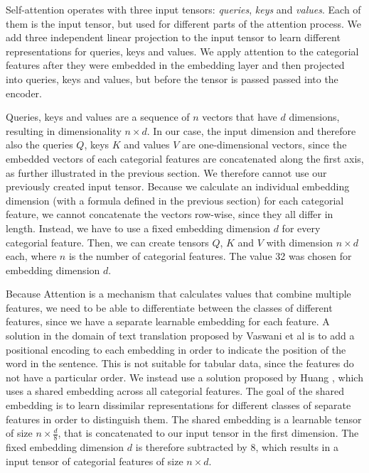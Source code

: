 Self-attention operates with three input tensors: \textit{queries}, \textit{keys} and \textit{values}. Each of them is the input tensor, but used for different parts of the attention process. We add three independent linear projection to the input tensor to learn different representations for queries, keys and values. We apply attention to the categorial features after they were embedded in the embedding layer and then projected into queries, keys and values, but before the tensor is passed passed into the encoder.

Queries, keys and values are a sequence of $n$ vectors that have $d$ dimensions, resulting in dimensionality $n \times d$. In our case, the input dimension and therefore also the queries $Q$, keys $K$ and values $V$ are one-dimensional vectors, since the embedded vectors of each categorial features are concatenated along the first axis, as further illustrated in the previous section. We therefore cannot use our previously created input tensor. Because we calculate an individual embedding dimension (with a formula defined in the previous section) for each categorial feature, we cannot concatenate the vectors row-wise, since they all differ in length. Instead, we have to use a fixed embedding dimension $d$ for every categorial feature. Then, we can create tensors $Q$, $K$ and $V$ with dimension $n \times d$ each, where $n$ is the number of categorial features. The value 32 was chosen for embedding dimension $d$.

Because Attention is a mechanism that calculates values that combine multiple features, we need to be able to differentiate between the classes of different features, since we have a separate learnable embedding for each feature. A solution in the domain of text translation proposed by Vaswani et al \cite{attention_is_all_you_need} is to add a positional encoding to each embedding in order to indicate the position of the word in the sentence. This is not suitable for tabular data, since the features do not have a particular order. We instead use a solution proposed by Huang \cite{tab_transformer}, which uses a shared embedding across all categorial features. The goal of the shared embedding is to learn dissimilar representations for different classes of separate features in order to distinguish them. The shared embedding is a learnable tensor of size $n \times \frac{d}{8}$, that is concatenated to our input tensor in the first dimension. The fixed embedding dimension $d$ is therefore subtracted by 8, which results in a input tensor of categorial features of size $n \times d$. 

